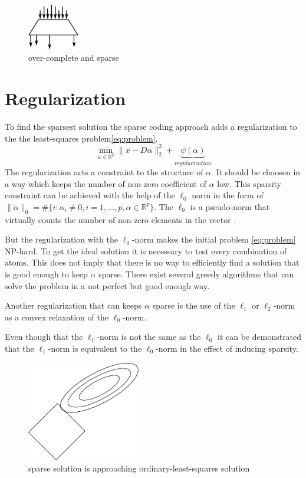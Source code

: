 \begin{figure}[h]
\centering
\includegraphics[width = 0.20\textwidth]{images/sparse.pdf}
\caption{over-complete and sparse}
\label{fig:sparse}
\end{figure}

\section{Regularization}
To find the sparsest solution the sparse coding approach adds a regularization
to the the least-squares problem\ref{eq:problem}. 
\begin{equation}
\min_{\alpha\in\mathbb{R}^{p}} \lVert x - D\alpha \rVert^{2}_{2} +
\underbrace{\psi(\alpha)}_{regularization}
\end{equation}
The regularization acts a constraint to the structure of $\alpha$. It should be
choosen in a way which keeps the number of non-zero coefficient of $\alpha$ low.
This sparsity constraint can be achieved with the help of the $\ell_0$ norm in
the form of $\lVert\alpha\rVert_{0} = \#\{i:\alpha_i \neq
0,i=1,...,p,\alpha\in\mathbb{R}^p\}$. The $\ell_0$ is a pseudo-norm that
virtually counts the number of non-zero elements in the vector .

But the regularization with the $\ell_0$-norm makes the initial problem
\ref{eq:problem} NP-hard. To get the ideal solution it is necessary to test
every combination of atoms. This does not imply that there is no way to
efficiently find a solution that is good enough to keep $\alpha$ sparse.
There exist several greedy algorithms that can solve the problem in a
not perfect but good enough way. 

Another regularization that can keeps $\alpha$ sparse is the use of the $\ell_1$
or $\ell_2$-norm as a convex relaxation of the $\ell_0$-norm.

Even though that the $\ell_1$-norm is not the same as the $\ell_0$ it can
be demonstrated that the $\ell_1$-norm is equivalent to the $\ell_0$-norm in
the effect of inducing sparsity.

\begin{figure}[h]
\centering
\includegraphics[width = 0.44\textwidth]{images/regularization.pdf}
\caption{sparse solution is approaching ordinary-least-squares solution}
\label{fig:sparse}
\end{figure}


